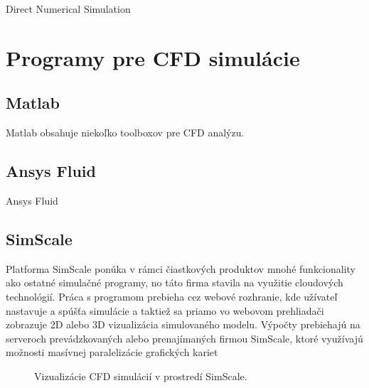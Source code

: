 \documentclass[]{tukediphc}
\begin{document}
Direct Numerical Simulation

\section{Programy pre CFD simulácie}

\subsection{Matlab}
Matlab obsahuje niekoľko toolboxov pre CFD analýzu. 

\subsection{Ansys Fluid}

Ansys Fluid

\subsection{SimScale}

Platforma SimScale ponúka v rámci čiastkových produktov mnohé funkcionality ako ostatné simulačné programy, no táto firma stavila na využitie cloudových technológií. Práca s programom prebieha cez webové rozhranie, kde užívateľ nastavuje a spúšťa simulácie a taktiež sa priamo vo webovom prehliadači zobrazuje 2D alebo 3D vizualizácia simulovaného modelu. Výpočty prebiehajú na serveroch prevádzkovaných alebo prenajímaných firmou SimScale, ktoré využívajú možnosti masívnej paralelizácie grafických kariet


\begin{figure}[!ht]
	\centering
	\qquad
	\caption{Vizualizácie CFD simulácií v prostredí SimScale.}
\end{figure}
\end{document}

